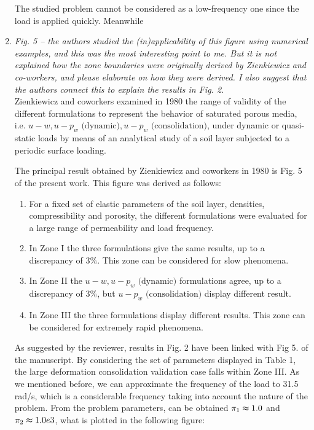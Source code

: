 \documentclass[12pt]{article}
\begin{document}
\begin{enumerate}
The studied problem cannot be considered as a low-frequency one since the load is applied quickly. Meanwhile

\item \textit{Fig. 5 -- the authors studied the (in)applicability of this figure using numerical examples, and this was the most interesting point to me. But it is not explained how the zone boundaries were originally derived by Zienkiewicz and co-workers, and please elaborate on how they were derived. I also suggest that the authors connect this to explain the results in Fig. 2. }\\

Zienkiewicz and coworkers examined in 1980 the range of validity of the different formulations to represent the behavior of saturated porous media, i.e. $u-w, u-p_w \text{ (dynamic)}, u-p_w \text{ (consolidation)}$,  under dynamic or quasi-static loads by means of an analytical study of a soil layer subjected to a periodic surface loading. 

The principal result obtained by Zienkiewicz and coworkers in 1980 is Fig. 5 of the present work. This figure was derived as follows: 

\begin{enumerate}
    \item For a fixed set of elastic parameters of the soil layer, densities, compressibility and porosity, the different formulations were evaluated for a large range of permeability and load frequency.
    \item In Zone I the three formulations give the same results, up to a discrepancy of $3\%$. This zone can be considered for slow phenomena.
    \item In Zone II the $u-w, u-p_w \text{ (dynamic)}$ formulations agree, up to a discrepancy of $3\%$, but $u-p_w \text{ (consolidation)}$ display different result.
    \item In Zone III the three formulations display different results. This zone can be considered for extremely rapid phenomena. 
\end{enumerate}

As suggested by the reviewer, results in Fig. 2 have been linked with Fig 5. of the manuscript. By considering the set of parameters displayed in Table 1, the large deformation consolidation validation case falls within Zone III. As we mentioned before, we can approximate the frequency of the load to 31.5 rad/s, which is a considerable frequency taking into account the nature of the problem. From the problem parameters, can be obtained $\pi_1 \thickapprox1.0$ and $\pi_2 \thickapprox 1.0e3$, what is plotted in the following figure:


\end{enumerate}
\end{document}
